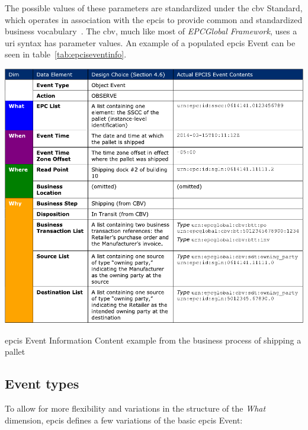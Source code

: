 The possible values of these parameters are standardized under the \ac{cbv} Standard, which operates in association with the \ac{epcis} to provide common and standardized business vocabulary~\cite{CoreBusinessVocabulary}. The \ac{cbv}, much like most of \emph{EPCGlobal Framework}, uses a \ac{uri} syntax has parameter values.
An example of a populated \ac{epcis} Event can be seen in table~\ref{tab:epciseventinfo}.

\begin{table}
    \centering
    \includegraphics[width=\textwidth]{./figs/02-state-of-the-art/epcis_data_visibility.pdf}
    \caption[\ac{epcis} Event Information Content example]{\ac{epcis} Event Information Content example from the business process of shipping a pallet~\cite{EPCISGuidelines}}
    \label{tab:epciseventinfo}
\end{table}

\subsection{Event types}

To allow for more flexibility and variations in the structure of the \emph{What} dimension, \ac{epcis} defines a few variations of the basic \ac{epcis} Event:

